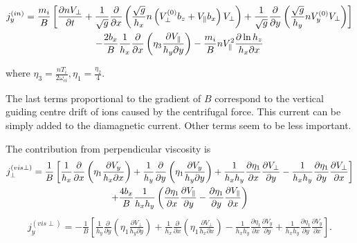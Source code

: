 \documentclass[a4paper,10pt]{report}
\begin{document}
\begin{multline}
\hfill j_{y}^{\left(in\right)}= \frac{m_i}{B}
\left[\frac{\partial n V_{\perp}}{\partial t} +
     \frac{1}{\sqrt{g}} \frac{\partial }{\partial x}
      \left(\frac{\sqrt{g}}{h_x} n\left(V_{\perp}^{\left( 0 \right)} b_z
+ V_{\parallel} b_x \right) V_{\perp}\right)+
     \frac{1}{\sqrt{g}} \frac{\partial }{\partial y}
      \left(\frac{\sqrt{g}}{h_y} n V_y^{\left( 0 \right)} V_{\perp}\right)
\right] \hfill \\
\hfill -
\frac{2 b_x}{B} \frac{1}{h_x}\frac{\partial}{\partial x}
\left(\eta_3
\frac{\partial V_{\parallel}}{h_y \partial y}\right) -
\frac{m_i}{B} n V_{\parallel}^2 \frac{\partial \ln h_z}{h_x \partial x}
\hfill
\end{multline}

where $\eta_3 = \frac{n T_i}{2 \omega_{ci}}, \eta _1 = \frac{\eta _2}{4}$.

The last terms proportional to the gradient of $B$ correspond to the vertical
guiding centre drift of ions caused by the centrifugal force. This current
can be simply added to the diamagnetic current. Other terms seem to be less
important.

The contribution from perpendicular viscosity is
\begin{multline}
\hfill j_{\perp}^{\left(vis \perp \right)}= \frac{1}{B}
\left[\frac{1}{h_x}\frac{\partial}{\partial x}\left(\eta_1
     \frac{\partial V_y}{h_x \partial x}\right)+
 \frac{1}{h_y}\frac{\partial}{\partial y}\left(\eta_1
     \frac{\partial V_y}{h_y \partial y}\right)+
\frac{1}{h_x h_y }\frac{\partial \eta_1}{\partial x}
     \frac{\partial V_{\perp}}{\partial y}-
\frac{1}{h_x h_y }\frac{\partial \eta_1}{\partial y}
     \frac{\partial V_{\perp}}{\partial x}\right] \hfill \\
\hfill +
\frac{4 b_x}{B} \frac{1}{h_x h_y}
\left(\frac{\partial \eta_1}{\partial x} \frac{\partial V_{\parallel}}
{\partial y} - \frac{\partial \eta_1}{\partial y}\frac{\partial V_{\parallel}}
{\partial x}
\right)
\hfill
\end{multline}
\begin{gather}
j_{y}^{\left(vis \perp \right)}= -\frac{1}{B}
\left[\frac{1}{h_y}\frac{\partial}{\partial y}\left(\eta_1
     \frac{\partial V_{\perp}}{h_y \partial y}\right)+
 \frac{1}{h_x}\frac{\partial}{\partial x}\left(\eta_1
     \frac{\partial V_{\perp}}{h_x \partial x}\right)-
\frac{1}{h_x h_y }\frac{\partial \eta_1}{\partial x}
     \frac{\partial V_y}{\partial y}+
\frac{1}{h_x h_y }\frac{\partial \eta_1}{\partial y}
     \frac{\partial V_y}{\partial x}\right].
\end{gather}
\end{document}
